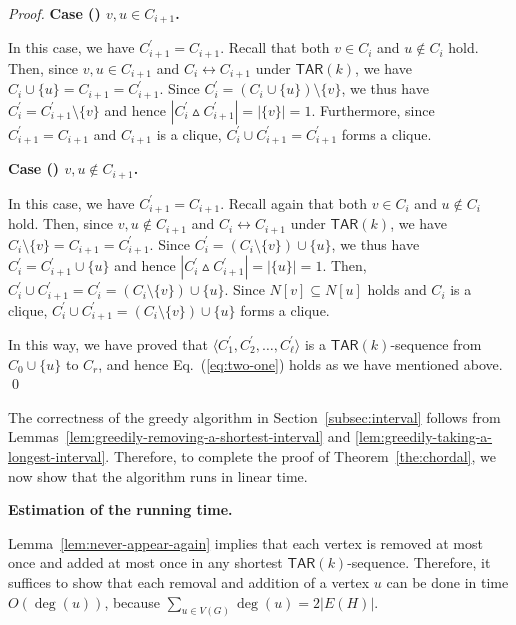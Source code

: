 \documentclass{llncs}
\newcommand{\onestep}{\leftrightarrow}
\newcommand{\TAR}[1]{\mathsf{TAR}(#1)}
\newcommand{\symdiff}[2]{#1 \vartriangle #2}
\newcommand{\ini}{0}
\newcommand{\tar}{r}
\newcommand{\cliq}{C}
\newcommand{\subH}{H}
\newcommand{\intH}{\subH}
\newcounter{one}
\newcounter{two}
\newcommand{\two}{{\rm \roman{two}}}
\newcounter{three}
\newcommand{\three}{{\rm \roman{three}}}
\begin{document}
\begin{proof}
\noindent
	{\bf Case (\two) $v, u \in \cliq_{i+1}$.} 

	In this case, we have $\cliq_{i+1}^\prime = \cliq_{i+1}$. 
	Recall that both $v \in \cliq_{i}$ and $u \notin \cliq_{i}$ hold. 
	Then, since $v, u \in \cliq_{i+1}$ and $\cliq_i \onestep \cliq_{i+1}$ under $\TAR{k}$, we have $\cliq_i \cup \{ u\} = \cliq_{i+1} = \cliq_{i+1}^\prime$.
	Since $\cliq_{i}^\prime = (\cliq_{i} \cup \{u\}) \setminus \{v\}$, we thus have $\cliq_{i}^\prime = \cliq_{i+1}^\prime \setminus \{v\}$ and hence $|\symdiff{\cliq_{i}^\prime}{\cliq_{i+1}^\prime}| = |\{v\}| = 1$. 
	Furthermore, since $\cliq_{i+1}^\prime = \cliq_{i+1}$ and $\cliq_{i+1}$ is a clique, $\cliq_{i}^\prime \cup \cliq_{i+1}^\prime = \cliq_{i+1}^\prime$ forms a clique.
\medskip

\noindent
	{\bf Case (\three) $v, u \notin \cliq_{i+1}$.} 
	
	In this case, we have $\cliq_{i+1}^\prime = \cliq_{i+1}$. 
	Recall again that both $v \in \cliq_{i}$ and $u \notin \cliq_{i}$ hold. 
	Then, since $v, u \not\in \cliq_{i+1}$ and $\cliq_i \onestep \cliq_{i+1}$ under $\TAR{k}$, we have $\cliq_i \setminus \{ v\} = \cliq_{i+1} = \cliq_{i+1}^\prime$.
	Since $\cliq_{i}^\prime = (\cliq_{i} \setminus \{v\}) \cup \{u\}$, we thus have $\cliq_{i}^\prime = \cliq_{i+1}^\prime \cup \{u\}$ and hence $|\symdiff{\cliq_{i}^\prime}{\cliq_{i+1}^\prime}| = |\{u\}| = 1$. 
	Then, $\cliq_{i}^\prime \cup \cliq_{i+1}^\prime = \cliq_{i}^\prime = (\cliq_{i} \setminus \{v\}) \cup \{u\}$.
	Since $N[v] \subseteq N[u]$ holds and $\cliq_i$ is a clique, $\cliq_{i}^\prime \cup \cliq_{i+1}^\prime = (\cliq_{i} \setminus \{v\}) \cup \{u\}$ forms a clique.
\medskip

	In this way, we have proved that $\langle \cliq_{1}^\prime, \cliq_2^\prime, \ldots, \cliq_{\ell}^\prime \rangle$ is a $\TAR{k}$-sequence from $\cliq_{\ini} \cup \{u\}$ to $\cliq_{\tar}$, and hence Eq.~(\ref{eq:two-one}) holds as we have mentioned above. 
\qed
\end{proof}




	The correctness of the greedy algorithm in Section~\ref{subsec:interval} follows from Lemmas~\ref{lem:greedily-removing-a-shortest-interval} and \ref{lem:greedily-taking-a-longest-interval}.
	Therefore, to complete the proof of Theorem~\ref{the:chordal}, we now show that the algorithm runs in linear time. 
\medskip

\noindent
	{\bf Estimation of the running time.}

	Lemma~\ref{lem:never-appear-again} implies that each vertex is removed at most once and added at most once in any shortest $\TAR{k}$-sequence.
	Therefore, it suffices to show that each removal and addition of a vertex $u$ can be done in time $O(\deg(u))$, because $\sum_{u \in V(G)} \deg(u) = 2 |E(\intH)|$.
\end{document}
